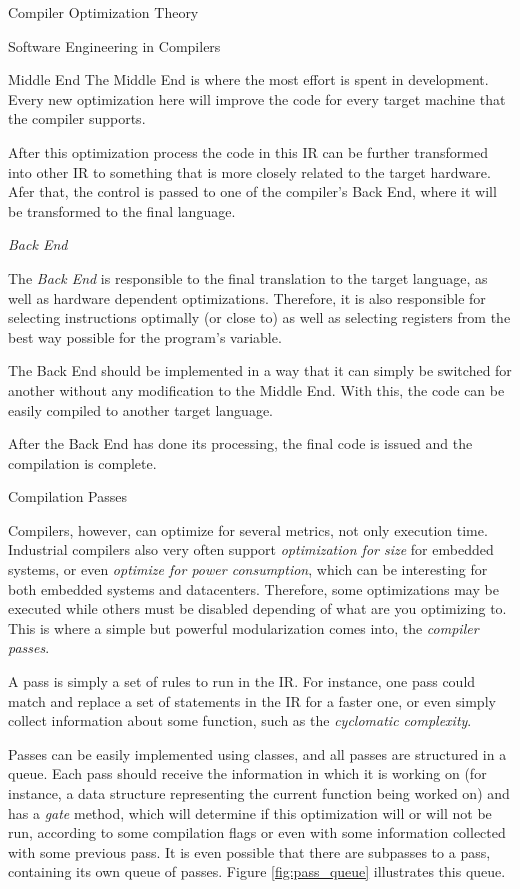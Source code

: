 \begin{section}{Compiler Optimization Theory}
\begin{section}{Software Engineering in Compilers}
\begin{subsection}{Middle End}
The Middle End is where the most effort is spent in development. Every new
optimization here will improve the code for every target machine that the
compiler supports.

After this optimization process the code in this IR can be further transformed
into other IR to something that is more closely related to the target hardware.
Afer that, the control is passed to one of the compiler's Back End, where it will
be transformed to the final language.

\end{subsection}

\begin{subsection}{\textit{Back End}}

	The \textit{Back End} is responsible to the final translation to the
	target language, as well as hardware dependent optimizations. Therefore,
	it is also responsible for selecting instructions optimally (or close to)
	as well as selecting registers from the best way possible for the program's
	variable.

	The Back End should be implemented in a way that it can simply be switched
	for another without any modification to the Middle End. With this, the
	code can be easily compiled to another target language.

	After the Back End has done its processing, the final code is issued and the
	compilation is complete.
\end{subsection}

\begin{subsection}{Compilation Passes}

Compilers, however, can optimize for several metrics, not only execution time.
Industrial compilers also very often support \textit{optimization for size} for
embedded systems, or even \textit{optimize for power consumption}, which can
be interesting for both embedded systems and datacenters. Therefore, some
optimizations may be executed while others must be disabled depending of
what are you optimizing to. This is where a simple but powerful modularization
comes into, the \textit{compiler passes}.

A pass is simply a set of rules to run in the IR. For instance, one pass
could match and replace a set of statements in the IR for a faster one,
or even simply collect information about some function, such as the
\textit{cyclomatic complexity}.

Passes can be easily implemented using classes, and all passes are structured
in a queue. Each pass should receive the information in which it is working on
(for instance, a data structure representing the current function being worked
on) and has a \textit{gate} method, which will determine if this optimization
will or will not be run, according to some compilation flags or even with some
information collected with some previous pass. It is even possible that there
are subpasses to a pass, containing its own queue of passes. Figure \ref{fig:pass_queue}
illustrates this queue. 


\end{subsection}
\end{section}
\end{section}
